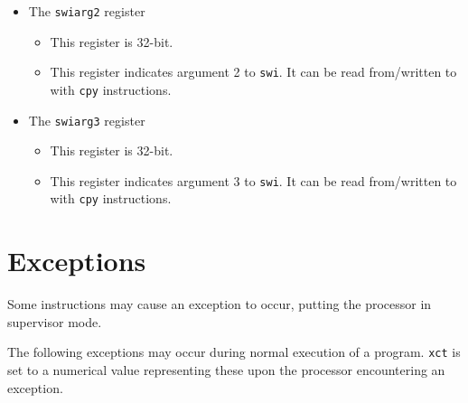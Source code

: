 \documentclass{article}
\begin{document}
\begin{itemize}
	\item The \texttt{swiarg2} register
		\begin{itemize}
		\item This register is 32-bit.

		\item This register indicates argument 2 to \texttt{swi}.  It can
		be read from/written to with \texttt{cpy} instructions.
		\end{itemize}

	\item The \texttt{swiarg3} register
		\begin{itemize}
		\item This register is 32-bit.

		\item This register indicates argument 3 to \texttt{swi}.  It can
		be read from/written to with \texttt{cpy} instructions.
		\end{itemize}
	\end{itemize}
	\newpage

\section{Exceptions}
	Some instructions may cause an exception to occur, putting the
	processor in supervisor mode.

	The following exceptions may occur during normal execution of a
	program.  \texttt{xct} is set to a numerical value representing these
	upon the processor encountering an exception. 
\end{document}
